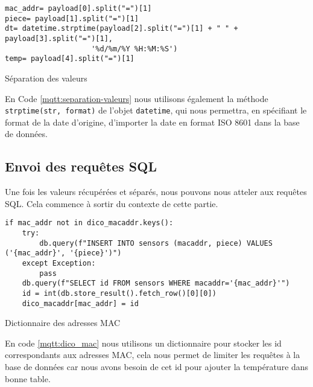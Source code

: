 \documentclass{article}
\begin{document}
    \begin{listing}[H]
        \begin{verbatim}
mac_addr= payload[0].split("=")[1]
piece= payload[1].split("=")[1]
dt= datetime.strptime(payload[2].split("=")[1] + " " + payload[3].split("=")[1],
                    '%d/%m/%Y %H:%M:%S')
temp= payload[4].split("=")[1]
        \end{verbatim}
        \caption{Séparation des valeurs}
        \label{mqtt:separation-valeurs}
    \end{listing}
    En Code \ref{mqtt:separation-valeurs} nous utilisons également la méthode \verb|strptime(str, format)| de l'objet \verb|datetime|, qui nous permettra, en spécifiant le format de la date d'origine, d'importer la date en format ISO 8601 dans la base de données.

    \subsection{Envoi des requêtes SQL}
    Une fois les valeurs récupérées et séparés, nous pouvons nous atteler aux requêtes SQL. Cela commence à sortir du contexte de cette partie.
    \begin{listing}[H]
        \begin{verbatim}
if mac_addr not in dico_macaddr.keys():
    try:
        db.query(f"INSERT INTO sensors (macaddr, piece) VALUES ('{mac_addr}', '{piece}')")
    except Exception:
        pass
    db.query(f"SELECT id FROM sensors WHERE macaddr='{mac_addr}'")
    id = int(db.store_result().fetch_row()[0][0])
    dico_macaddr[mac_addr] = id
        \end{verbatim}
        \caption{Dictionnaire des adresses MAC}
        \label{mqtt:dico_mac}
    \end{listing}
    En code \ref{mqtt:dico_mac} nous utilisons un dictionnaire pour stocker les id correspondants aux adresses MAC, cela nous permet de limiter les requêtes à la base de données car nous avons besoin de cet id pour ajouter la température dans bonne table.
\end{document}
